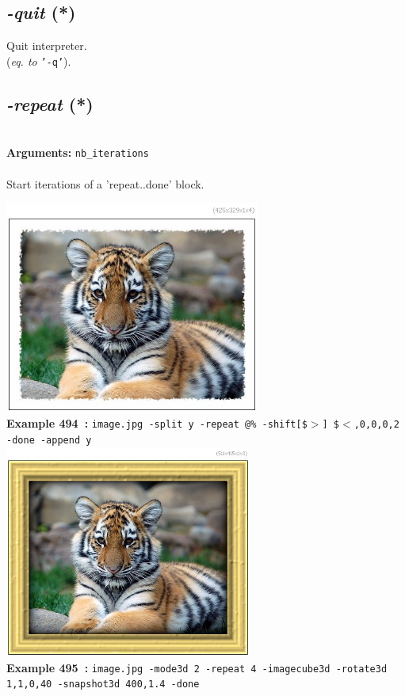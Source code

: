 \documentclass[a4paper,11pt,twoside]{book}
\begin{document}
\subsection{\emph{-quit} (*)}\vspace*{-0.5em}
Quit interpreter.
~\\(\emph{eq. to} {\small \texttt{'-q'}}).


\subsection{\emph{-repeat} (*)}\vspace*{-0.5em}
~\\\textbf{Arguments: } 
{\small \texttt{nb\_iterations}}\\~\\
Start iterations of a 'repeat..done' block.
\begin{center}\includegraphics[keepaspectratio=true,height=7cm,width=\textwidth]{img/gmic_def494.jpg}\\
{\footnotesize \textbf{Example 494~:} \texttt{image.jpg -split y -repeat @\% -shift[\$$>$] \$$<$,0,0,0,2 -done -append y}}
\\\includegraphics[keepaspectratio=true,height=7cm,width=\textwidth]{img/gmic_def495.jpg}\\
{\footnotesize \textbf{Example 495~:} \texttt{image.jpg -mode3d 2 -repeat 4 -imagecube3d -rotate3d 1,1,0,40 -snapshot3d 400,1.4 -done}}
\end{center}
\end{document}

